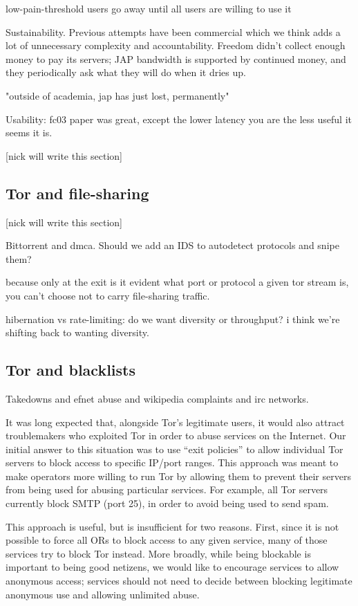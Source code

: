 \documentclass{llncs}
\begin{document}
low-pain-threshold users go away until all users are willing to use it

Sustainability. Previous attempts have been commercial which we think
adds a lot of unnecessary complexity and accountability. Freedom didn't
collect enough money to pay its servers; JAP bandwidth is supported by
continued money, and they periodically ask what they will do when it
dries up.

"outside of academia, jap has just lost, permanently"

Usability: fc03 paper was great, except the lower latency you are the
less useful it seems it is.

[nick will write this section]

\subsection{Tor and file-sharing}

[nick will write this section]

Bittorrent and dmca. Should we add an IDS to autodetect protocols and
snipe them?

because only at the exit is it evident what port or protocol a given
tor stream is, you can't choose not to carry file-sharing traffic.

hibernation vs rate-limiting: do we want diversity or throughput? i
think we're shifting back to wanting diversity.

\subsection{Tor and blacklists}

Takedowns and efnet abuse and wikipedia complaints and irc
networks.

It was long expected that, alongside Tor's legitimate users, it would also
attract troublemakers who exploited Tor in order to abuse services on the
Internet.  Our initial answer to this situation was to use ``exit policies''
to allow individual Tor servers to block access to specific IP/port ranges.
This approach was meant to make operators more willing to run Tor by allowing
them to prevent their servers from being used for abusing particular
services.  For example, all Tor servers currently block SMTP (port 25), in
order to avoid being used to send spam.

This approach is useful, but is insufficient for two reasons.  First, since
it is not possible to force all ORs to block access to any given service,
many of those services try to block Tor instead.  More broadly, while being
blockable is important to being good netizens, we would like to encourage
services to allow anonymous access; services should not need to decide
between blocking legitimate anonymous use and allowing unlimited abuse.
\end{document}
